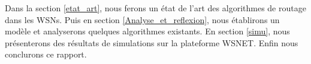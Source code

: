 Dans la section \ref{etat_art}, nous ferons un état de l'art des algorithmes de routage dans les WSNs. Puis en section \ref{Analyse_et_reflexion}, nous établirons un modèle et analyserons quelques algorithmes existants. En section \ref{simu}, nous présenterons des résultats de simulations sur la plateforme WSNET. Enfin nous conclurons ce rapport.


